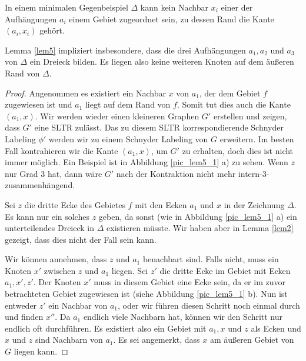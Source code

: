 \begin{lemma}\label{lem5}
In einem minimalen Gegenbeispiel $\Delta$ kann kein Nachbar $x_i$ einer der Aufhängungen $a_i$ einem Gebiet zugeordnet sein, zu dessen Rand die Kante $(a_i,x_i)$ gehört.
\end{lemma}

\begin{remark}
Lemma \ref{lem5} impliziert insbesondere, dass die drei Aufhängungen $a_1,a_2$ und $a_3$ von $\Delta$ ein Dreieck bilden. Es liegen also keine weiteren Knoten auf dem äußeren Rand von $\Delta$.
\end{remark}

\begin{proof}
Angenommen es existiert ein Nachbar $x$ von $a_1$, der dem Gebiet $f$ zugewiesen ist und $a_1$ liegt auf dem Rand von $f$. Somit tut dies auch die Kante $(a_1,x)$. Wir werden wieder einen kleineren Graphen $G'$ erstellen und zeigen, dass $G'$ eine SLTR zulässt. Das zu diesem SLTR korrespondierende Schnyder Labeling $\phi'$ werden wir zu einem Schnyder Labeling von $G$ erweitern. Im besten Fall kontrahieren wir die Kante $(a_1,x)$, um $G'$ zu erhalten, doch dies ist nicht immer möglich. Ein Beispiel ist in Abbildung \ref{pic_lem5_1} a) zu sehen. Wenn $z$ nur Grad 3 hat, dann wäre $G'$ nach der Kontraktion nicht mehr intern-3-zusammenhängend.

Sei $z$ die dritte Ecke des Gebietes $f$ mit den Ecken $a_1$ und $x$ in der Zeichnung $\Delta$. Es kann nur ein solches $z$ geben, da sonst (wie in Abbildung \ref{pic_lem5_1} a) ein unterteilendes Dreieck in $\Delta$ existieren müsste. Wir haben aber in Lemma \ref{lem2} gezeigt, dass dies nicht der Fall sein kann.

Wir können annehmen, dass $z$ und $a_1$ benachbart sind. Falls nicht, muss ein Knoten $x'$ zwischen $z$ und $a_1$ liegen. Sei $z'$ die dritte Ecke im Gebiet mit Ecken $a_1,x',z'$. Der Knoten $x'$ muss in diesem Gebiet eine Ecke sein, da er im zuvor betrachteten Gebiet zugewiesen ist (siehe Abbildung \ref{pic_lem5_1} b). Nun ist entweder $z'$ ein Nachbar von $a_1$, oder wir führen diesen Schritt noch einmal durch und finden $x''$. Da $a_1$ endlich viele Nachbarn hat, können wir den Schritt nur endlich oft durchführen. Es existiert also ein Gebiet mit $a_1, x$ und $z$ als Ecken und $x$ und $z$ sind Nachbarn von $a_1$. Es sei angemerkt, dass $x$ am äußeren Gebiet von $G$ liegen kann.


\end{proof}

